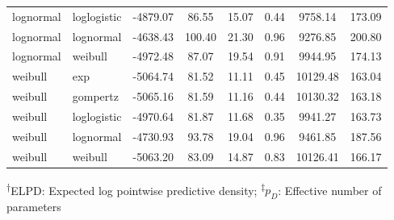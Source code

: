 \documentclass[AMA,STIX1COL]{WileyNJD-v2}
\begin{document}
\begin{table}[H]
\begin{tabular}{l l c c c c c c}
lognormal & loglogistic & -4879.07 & 86.55 & 15.07 & 0.44 & 9758.14 & 173.09\\
lognormal & lognormal & -4638.43 & 100.40 & 21.30 & 0.96 & 9276.85 & 200.80\\
lognormal & weibull & -4972.48 & 87.07 & 19.54 & 0.91 & 9944.95 & 174.13\\
weibull & exp & -5064.74 & 81.52 & 11.11 & 0.45 & 10129.48 & 163.04\\
weibull & gompertz & -5065.16 & 81.59 & 11.16 & 0.44 & 10130.32 & 163.18\\
weibull & loglogistic & -4970.64 & 81.87 & 11.68 & 0.35 & 9941.27 & 163.73\\
weibull & lognormal & -4730.93 & 93.78 & 19.04 & 0.96 & 9461.85 & 187.56\\
weibull & weibull & -5063.20 & 83.09 & 14.87 & 0.83 & 10126.41 & 166.17\\
\bottomrule
\end{tabular}
\begin{tablenotes}%
\textsuperscript{$\dagger$}ELPD: Expected log pointwise predictive density;
\textsuperscript{$\ddagger$}$p_D$: Effective number of parameters
\end{tablenotes}
\end{table}
\end{document}
